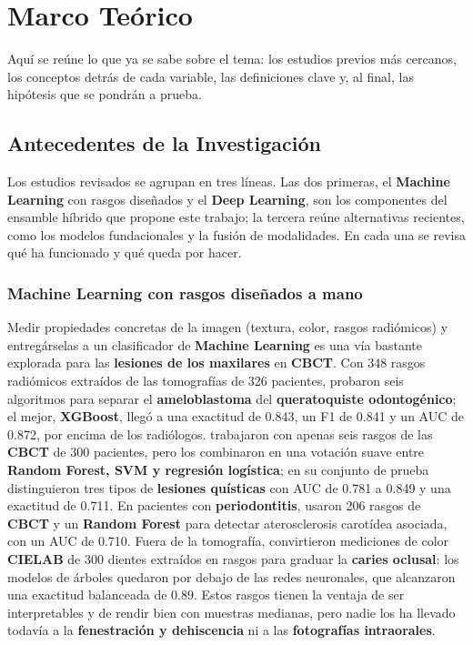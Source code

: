 \documentclass[12pt,a4paper]{article}
\newcommand{\prob}[1]{\textcolor{problema}{\textbf{#1}}}
\newcommand{\sol}[1]{\textcolor{solucion}{\textbf{#1}}}
\newcommand{\dat}[1]{\textcolor{dataset}{\textbf{#1}}}
\newcommand{\prob}[1]{#1}
\newcommand{\sol}[1]{#1}
\newcommand{\dat}[1]{#1}
\begin{document}
\section{Marco Teórico}
Aquí se reúne lo que ya se sabe sobre el tema: los estudios previos más
cercanos, los conceptos detrás de cada variable, las definiciones clave y,
al final, las hipótesis que se pondrán a prueba.

\subsection{Antecedentes de la Investigación}
Los estudios revisados se agrupan en tres líneas. Las dos primeras, el
\sol{Machine Learning} con rasgos diseñados y el \sol{Deep Learning}, son
los componentes del ensamble híbrido que propone este trabajo; la
tercera reúne alternativas recientes, como los modelos fundacionales y la
fusión de modalidades. En cada una se revisa qué ha funcionado y qué
queda por hacer.

\subsubsection{Machine Learning con rasgos diseñados a mano}
Medir propiedades concretas de la imagen (textura, color, rasgos
radiómicos) y entregárselas a un clasificador de \sol{Machine Learning} es
una vía bastante explorada para las \prob{lesiones de los maxilares} en
\dat{CBCT}. Con 348 rasgos radiómicos extraídos de las tomografías de 326
pacientes, \textcite{song2024radiomics} probaron seis algoritmos para
separar el \prob{ameloblastoma} del \prob{queratoquiste odontogénico}; el
mejor, \sol{XGBoost}, llegó a una exactitud de 0.843, un F1 de 0.841 y un
AUC de 0.872, por encima de los radiólogos. \textcite{sha2025radiomics}
trabajaron con apenas seis rasgos de las \dat{CBCT} de 300 pacientes, pero
los combinaron en una votación suave entre \sol{Random Forest, SVM y
regresión logística}; en su conjunto de prueba distinguieron tres tipos de
\prob{lesiones quísticas} con AUC de 0.781 a 0.849 y una exactitud de
0.711. En pacientes con \prob{periodontitis}, \textcite{zhang2026radiomic}
usaron 206 rasgos de \dat{CBCT} y un \sol{Random Forest} para detectar
aterosclerosis carotídea asociada, con un AUC de 0.710. Fuera de la
tomografía, \textcite{rashid2026cielab} convirtieron mediciones de color
\dat{CIELAB} de 300 dientes extraídos en rasgos para graduar la
\prob{caries oclusal}: los modelos de árboles quedaron por debajo de las
redes neuronales, que alcanzaron una exactitud balanceada de 0.89. Estos
rasgos tienen la ventaja de ser interpretables y de rendir bien con
muestras medianas, pero nadie los ha llevado todavía a la
\prob{fenestración y dehiscencia} ni a las \dat{fotografías intraorales}.
\end{document}
